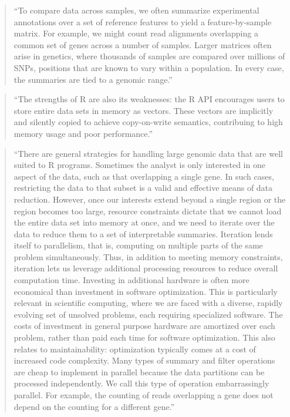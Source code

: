 \documentclass[]{tufte-book}
\begin{document}
\begin{quote}
``To compare data across samples, we often summarize experimental annotations
over a set of reference features to yield a feature-by-sample matrix. For
example, we might count read alignments overlapping a common set of genes across
a number of samples. Larger matrices often arise in genetics, where thousands of
samples are compared over millions of SNPs, positions that are known to vary
within a population. In every case, the summaries are tied to a genomic range.''
\citep{lawrence2014scalable}
\end{quote}

\begin{quote}
``The strengths of R are also its weaknesses: the R API encourages users to
store entire data sets in memory as vectors. These vectors are implicitly and
silently copied to achieve copy-on-write semantics, contribuing to high memory
usage and poor performance.'' \citep{lawrence2014scalable}
\end{quote}

\begin{quote}
``There are general strategies for handling large genomic data that are well
suited to R programs. Sometimes the analyst is only interested in one aspect of
the data, such as that overlapping a single gene. In such cases, restricting the
data to that subset is a valid and effective means of data reduction. However,
once our interests extend beyond a single region or the region becomes too
large, resource constraints dictate that we cannot load the entire data set into
memory at once, and we need to iterate over the data to reduce them to a set of
interpretable summaries. Iteration lends itself to parallelism, that is,
computing on multiple parts of the same problem simultaneously. Thus, in
addition to meeting memory constraints, iteration lets us leverage additional
processing resources to reduce overall computation time. Investing in additional
hardware is often more economical than investment in software optimization. This
is particularly relevant in scientific computing, where we are faced with a
diverse, rapidly evolving set of unsolved problems, each requiring specialized
software. The costs of investment in general purpose hardware are amortized over
each problem, rather than paid each time for software optimization. This also
relates to maintainability: optimization typically comes at a cost of increased
code complexity. Many types of summary and filter operations are cheap to
implement in parallel because the data partitions can be processed
independently. We call this type of operation embarrassingly parallel. For
example, the counting of reads overlapping a gene does not depend on the
counting for a different gene.'' \citep{lawrence2014scalable}
\end{quote}
\end{document}
